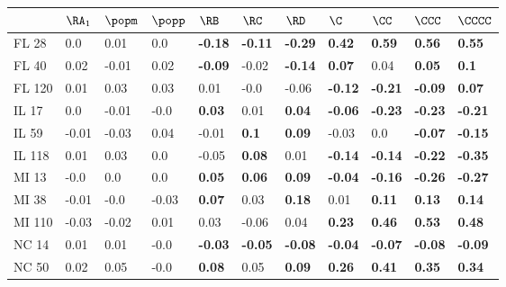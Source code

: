 \begin{tabular}{lllllllllll}
\toprule
{} & $\RA_1$ &        $\popm$ & $\popp$ &           $\RB$ &           $\RC$ &           $\RD$ &            $\C$ &           $\CC$ &          $\CCC$ &         $\CCCC$ \\
\midrule
FL 28   &     0.0 &           0.01 &     0.0 &  \textbf{-0.18} &  \textbf{-0.11} &  \textbf{-0.29} &   \textbf{0.42} &   \textbf{0.59} &   \textbf{0.56} &   \textbf{0.55} \\
FL 40   &    0.02 &          -0.01 &    0.02 &  \textbf{-0.09} &           -0.02 &  \textbf{-0.14} &   \textbf{0.07} &            0.04 &   \textbf{0.05} &    \textbf{0.1} \\
FL 120  &    0.01 &           0.03 &    0.03 &            0.01 &            -0.0 &           -0.06 &  \textbf{-0.12} &  \textbf{-0.21} &  \textbf{-0.09} &   \textbf{0.07} \\
IL 17   &     0.0 &          -0.01 &    -0.0 &   \textbf{0.03} &            0.01 &   \textbf{0.04} &  \textbf{-0.06} &  \textbf{-0.23} &  \textbf{-0.23} &  \textbf{-0.21} \\
IL 59   &   -0.01 &          -0.03 &    0.04 &           -0.01 &    \textbf{0.1} &   \textbf{0.09} &           -0.03 &             0.0 &  \textbf{-0.07} &  \textbf{-0.15} \\
IL 118  &    0.01 &           0.03 &     0.0 &           -0.05 &   \textbf{0.08} &            0.01 &  \textbf{-0.14} &  \textbf{-0.14} &  \textbf{-0.22} &  \textbf{-0.35} \\
MI 13   &    -0.0 &            0.0 &     0.0 &   \textbf{0.05} &   \textbf{0.06} &   \textbf{0.09} &  \textbf{-0.04} &  \textbf{-0.16} &  \textbf{-0.26} &  \textbf{-0.27} \\
MI 38   &   -0.01 &           -0.0 &   -0.03 &   \textbf{0.07} &            0.03 &   \textbf{0.18} &            0.01 &   \textbf{0.11} &   \textbf{0.13} &   \textbf{0.14} \\
MI 110  &   -0.03 &          -0.02 &    0.01 &            0.03 &           -0.06 &            0.04 &   \textbf{0.23} &   \textbf{0.46} &   \textbf{0.53} &   \textbf{0.48} \\
NC 14   &    0.01 &           0.01 &    -0.0 &  \textbf{-0.03} &  \textbf{-0.05} &  \textbf{-0.08} &  \textbf{-0.04} &  \textbf{-0.07} &  \textbf{-0.08} &  \textbf{-0.09} \\
NC 50   &    0.02 &           0.05 &    -0.0 &   \textbf{0.08} &            0.05 &   \textbf{0.09} &   \textbf{0.26} &   \textbf{0.41} &   \textbf{0.35} &   \textbf{0.34} \\

\end{tabular}

